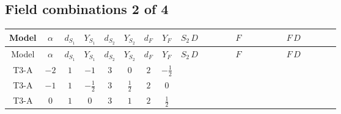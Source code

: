 \documentclass[8pt]{article}
\begin{document}
\begin{landscape}
\subsection*{Field combinations 2 of 4}
\begin{longtable}{@{}cccccccc >{\raggedright\arraybackslash}p{0.21\linewidth} >{\raggedright\arraybackslash}p{0.21\linewidth} >{\raggedright\arraybackslash}p{0.21\linewidth}@{}}
\toprule
Model & $\alpha$ & $d_{S_1}$ & $Y_{S_1}$ & $d_{S_2}$ & $Y_{S_2}$ & $d_F$ & $Y_F$ & $S_2\,D$ & $F$ & $F\,D$ \\
\midrule
\endfirsthead
\toprule
Model & $\alpha$ & $d_{S_1}$ & $Y_{S_1}$ & $d_{S_2}$ & $Y_{S_2}$ & $d_F$ & $Y_F$ & $S_2\,D$ & $F$ & $F\,D$ \\
\midrule
\endhead
T3-A & $-2$ & $1$ & $-1$ & $3$ & $0$ & $2$ & $-\frac{1}{2}$ & \scriptsize\adjustbox{max width=\linewidth}{$\begin{gathered} +D_{\mu _1}\left(S_{2,j_1}\right){}^{\dagger } D_{\mu _1}\left(S_{2,j_1}\right)\end{gathered}$} & \scriptsize\adjustbox{max width=\linewidth}{$\begin{gathered} -\overline{F_{j_1,r_1}}\, F_{j_1,r_1} M_F\end{gathered}$} & \scriptsize\adjustbox{max width=\linewidth}{$\begin{gathered} +i \overline{F_{j_1,r_1}}\, \gamma ^{\mu _1}\, D_{\mu _1}\left(F_{j_1,r_1}\right)\end{gathered}$} \\
\midrule
T3-A & $-1$ & $1$ & $-\frac{1}{2}$ & $3$ & $\frac{1}{2}$ & $2$ & $0$ & \scriptsize\adjustbox{max width=\linewidth}{$\begin{gathered} +D_{\mu _1}\left(S_{2,j_1}\right){}^{\dagger } D_{\mu _1}\left(S_{2,j_1}\right)\end{gathered}$} & \scriptsize\adjustbox{max width=\linewidth}{$\begin{gathered} -\overline{F_{j_1,r_1}}\, F_{j_1,r_1} M_F\end{gathered}$} & \scriptsize\adjustbox{max width=\linewidth}{$\begin{gathered} +i \overline{F_{j_1,r_1}}\, \gamma ^{\mu _1}\, D_{\mu _1}\left(F_{j_1,r_1}\right)\end{gathered}$} \\
\midrule
T3-A & $0$ & $1$ & $0$ & $3$ & $1$ & $2$ & $\frac{1}{2}$ & \scriptsize\adjustbox{max width=\linewidth}{$\begin{gathered} +D_{\mu _1}\left(S_{2,j_1}\right){}^{\dagger } D_{\mu _1}\left(S_{2,j_1}\right)\end{gathered}$} & \scriptsize\adjustbox{max width=\linewidth}{$\begin{gathered} -\overline{F_{j_1,r_1}}\, F_{j_1,r_1} M_F\end{gathered}$} & \scriptsize\adjustbox{max width=\linewidth}{$\begin{gathered} +i \overline{F_{j_1,r_1}}\, \gamma ^{\mu _1}\, D_{\mu _1}\left(F_{j_1,r_1}\right)\end{gathered}$} \\

\end{longtable}
\end{landscape}
\end{document}
